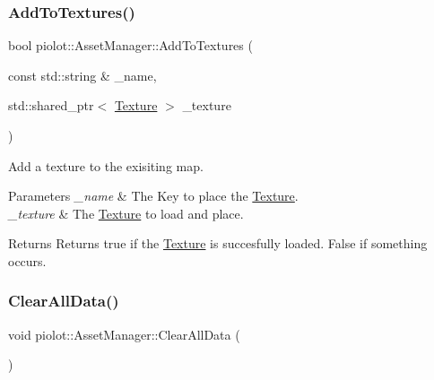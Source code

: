 \mbox{\label{classpiolot_1_1_asset_manager_a06b647312e18c2ca212d34211d262783}} 
\subsubsection{\texorpdfstring{Add\+To\+Textures()}{AddToTextures()}}
{\footnotesize\ttfamily bool piolot\+::\+Asset\+Manager\+::\+Add\+To\+Textures (\begin{DoxyParamCaption}\item[{const std\+::string \&}]{\+\_\+name,  }\item[{std\+::shared\+\_\+ptr$<$ \mbox{\hyperlink{classpiolot_1_1_texture}{Texture}} $>$}]{\+\_\+texture }\end{DoxyParamCaption})\hspace{0.3cm}{\ttfamily [inline]}}



Add a texture to the exisiting map. 


\begin{DoxyParams}{Parameters}
{\em \+\_\+name} & The Key to place the \mbox{\hyperlink{classpiolot_1_1_texture}{Texture}}. \\
\hline
{\em \+\_\+texture} & The \mbox{\hyperlink{classpiolot_1_1_texture}{Texture}} to load and place. \\
\hline
\end{DoxyParams}
\begin{DoxyReturn}{Returns}
Returns true if the \mbox{\hyperlink{classpiolot_1_1_texture}{Texture}} is succesfully loaded. False if something occurs. 
\end{DoxyReturn}
\mbox{\label{classpiolot_1_1_asset_manager_ab6e938de7632862bfbe0a673b6c53b21}} 
\subsubsection{\texorpdfstring{Clear\+All\+Data()}{ClearAllData()}}
{\footnotesize\ttfamily void piolot\+::\+Asset\+Manager\+::\+Clear\+All\+Data (\begin{DoxyParamCaption}{ }\end{DoxyParamCaption})\hspace{0.3cm}{\ttfamily [inline]}}

